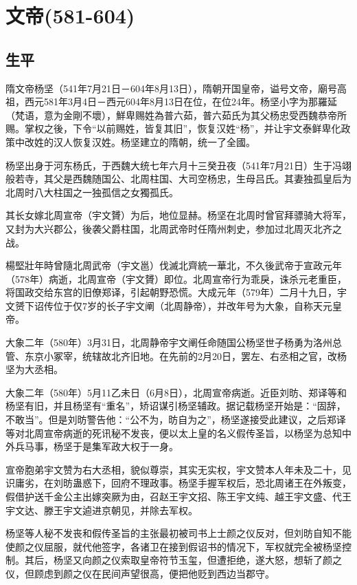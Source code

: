 
\section{文帝\tiny(581-604)}

\subsection{生平}

隋文帝杨坚（541年7月21日－604年8月13日），隋朝开国皇帝，谥号文帝，廟号高祖，西元581年3月4日－西元604年8月13日在位，在位24年。杨坚小字为那羅延（梵语，意为金剛不壞），鮮卑赐姓為普六茹，普六茹氏为其父杨忠受西魏恭帝所赐。掌权之後，下令“以前赐姓，皆复其旧”，恢复汉姓“杨”，并让宇文泰鲜卑化政策中改姓的汉人恢复汉姓。杨坚建立的隋朝，统一了全國。

杨坚出身于河东杨氏，于西魏大统七年六月十三癸丑夜（541年7月21日）生于冯翊般若寺，其父是西魏随国公、北周柱国、大司空杨忠，生母吕氏。其妻独孤皇后为北周时八大柱国之一独孤信之女獨孤氏。

其长女嫁北周宣帝（宇文贇）为后，地位显赫。杨坚在北周时曾官拜骠骑大将军，又封为大兴郡公，後袭父爵柱国，北周武帝时任隋州刺史，参加过北周灭北齐之战。

楊堅壯年時曾隨北周武帝（宇文邕）伐滅北齊統一華北，不久後武帝于宣政元年（578年）病逝，北周宣帝（宇文贇）即位。北周宣帝行为乖戾，诛杀元老重臣，将国政交给东宫的旧僚郑译，引起朝野恐慌。大成元年（579年）二月十九日，宇文赟下诏传位于仅7岁的长子宇文阐（北周静帝），并改年号为大象，自称天元皇帝。

大象二年（580年）3月31日，北周静帝宇文阐任命随国公杨坚世子杨勇为洛州总管、东京小冢宰，统辖故北齐旧地。在先前的2月20日，罢左、右丞相之官，改杨坚为大丞相。

大象二年（580年）5月11乙未日（6月8日），北周宣帝病逝。近臣刘昉、郑译等和杨坚有旧，并且杨坚有“重名”，矫诏谋引杨坚辅政。据记载杨坚开始是：“固辞，不敢当”。但是刘昉警告他：“公不为，昉自为之”，杨坚遂接受此建议，之后郑译等对北周宣帝病逝的死讯秘不发丧，便以太上皇的名义假传圣旨，以杨坚为总知中外兵马事，杨坚于是集军政大权于一身。

宣帝胞弟宇文赞为右大丞相，貌似尊崇，其实无实权，宇文赞本人年未及二十，见识庸劣，在刘昉蛊惑下，回府不理政事。杨坚手握军权后，恐北周诸王在外叛变，假借护送千金公主出嫁突厥为由，召赵王宇文招、陈王宇文纯、越王宇文盛、代王宇文达、滕王宇文逌进京朝见，并除去军权。

杨坚等人秘不发丧和假传圣旨的主张最初被司书上士颜之仪反对，但刘昉自知不能使颜之仪屈服，就代他签字，各诸卫在接到假诏书的情况下，军权就完全被杨坚控制。其后，杨坚又向颜之仪索取皇帝符节玉玺，但遭拒绝，遂大怒，想斩了颜之仪，但顾虑到颜之仪在民间声望很高，便把他贬到西边当郡守。

